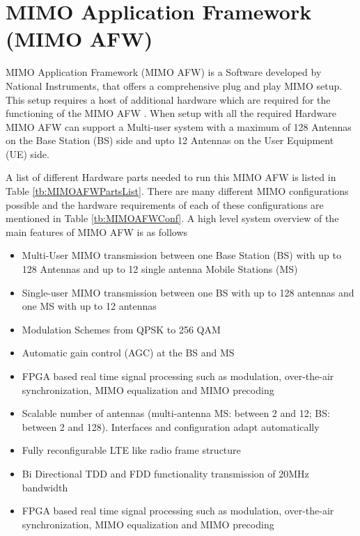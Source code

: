 \section{MIMO Application Framework (MIMO AFW)}\label{sec:MIMOAFW}
MIMO Application Framework (MIMO AFW) is a Software developed by National Instruments, that offers a comprehensive plug and play MIMO setup. This setup requires a host of additional hardware which are required for the functioning of the MIMO AFW \cite{MIMOAFWGettingStarted}. When setup with all the required Hardware MIMO AFW can support a Multi-user system with a maximum of 128 Antennas on the Base Station (BS) side and upto 12 Antennas on the User Equipment (UE) side.

A list of different Hardware parts needed to run this MIMO AFW is listed in Table \ref{tb:MIMOAFWPartsList}. There are many different MIMO configurations possible and the hardware requirements of each of these configurations are mentioned in Table \ref{tb:MIMOAFWConf}. A high level system overview of the main features of MIMO AFW is as follows

\begin{itemize}

    \item Multi-User MIMO transmission between one Base Station (BS) with up to 128 Antennas and up to 12 single antenna Mobile Stations (MS)
    \item Single-user MIMO transmission between one BS with up to 128 antennas and one MS with up to 12 antennas
    \item Modulation Schemes from QPSK to 256 QAM
    \item Automatic gain control (AGC) at the BS and MS
    \item FPGA based real time signal processing such as modulation, over-the-air synchronization, MIMO equalization and MIMO precoding
    \item Scalable number of antennas (multi-antenna MS: between 2 and 12; BS: between 2 and 128). Interfaces and configuration adapt automatically
    \item Fully reconfigurable LTE like radio frame structure
    \item Bi Directional TDD and FDD functionality transmission of 20MHz bandwidth
    \item FPGA based real time signal processing such as modulation, over-the-air synchronization, MIMO equalization and MIMO precoding
\end{itemize}



